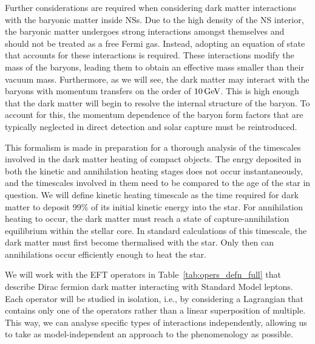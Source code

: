 Further considerations are required when considering dark matter interactions with the baryonic matter inside NSs. Due to the high density of the NS interior, the baryonic matter undergoes strong interactions amongst themselves and should not be treated as a free Fermi gas. Instead, adopting an equation of state that accounts for these interactions is required. These interactions modify the mass of the baryons, leading them to obtain an effective mass smaller than their vacuum mass. Furthermore, as we will see, the dark matter may interact with the baryons with momentum transfers on the order of $10{\rm \,GeV}$. This is high enough that the dark matter will begin to resolve the internal structure of the baryon. To account for this, the momentum dependence of the baryon form factors that are typically neglected in direct detection and solar capture must be reintroduced.

This formalism is made in preparation for a thorough analysis of the timescales involved in the dark matter heating of compact objects. The enrgy deposited in both the kinetic and annihilation heating stages does not occur instantaneously, and the timescales involved in them need to be compared to the age of the star in question. We will define kinetic heating timescale as the time required for dark matter to deposit 99\% of its initial kinetic energy into the star. For annihilation heating to occur, the dark matter must reach a state of capture-annihilation equilibrium within the stellar core. In standard calculations of this timescale, the dark matter must first become thermalised with the star. Only then can annihilations occur efficiently enough to heat the star. 


We will work with the EFT operators in Table~\ref{tab:opers_defn_full} that describe Dirac fermion dark matter interacting with Standard Model leptons. Each operator will be studied in isolation, i.e., by considering a Lagrangian that contains only one of the operators rather than a linear superposition of multiple. This way, we can analyse specific types of interactions independently, allowing us to take as model-independent an approach to the phenomenology as possible. 